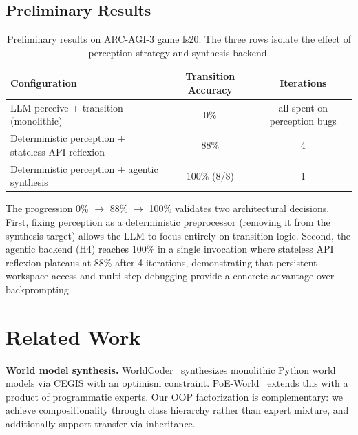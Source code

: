\documentclass{article}
\begin{document}
\subsection{Preliminary Results}
\label{sec:results}

\begin{table}[h]
\centering
\caption{Preliminary results on ARC-AGI-3 game ls20.  The three rows
isolate the effect of perception strategy and synthesis backend.}
\label{tab:results}
\begin{tabular}{@{}lcc@{}}
\toprule
\textbf{Configuration} & \textbf{Transition Accuracy} & \textbf{Iterations} \\
\midrule
LLM perceive + transition (monolithic) & 0\% & all spent on perception bugs \\
Deterministic perception + stateless API reflexion & 88\% & 4 \\
Deterministic perception + agentic synthesis & 100\% (8/8) & 1 \\
\bottomrule
\end{tabular}
\end{table}

The progression 0\% $\to$ 88\% $\to$ 100\% validates two architectural
decisions.  First, fixing perception as a deterministic preprocessor
(removing it from the synthesis target) allows the LLM to focus entirely on
transition logic.  Second, the agentic backend (H4) reaches 100\% in a single
invocation where stateless API reflexion plateaus at 88\% after 4 iterations,
demonstrating that persistent workspace access and multi-step debugging
provide a concrete advantage over backprompting.



\section{Related Work}
\label{sec:related}

\textbf{World model synthesis.}
WorldCoder~\cite{tang2024worldcoder} synthesizes monolithic Python world models
via CEGIS with an optimism constraint.  PoE-World~\cite{poeworld2025} extends
this with a product of programmatic experts.  Our OOP factorization is
complementary: we achieve compositionality through class hierarchy rather than
expert mixture, and additionally support transfer via inheritance.
\end{document}
